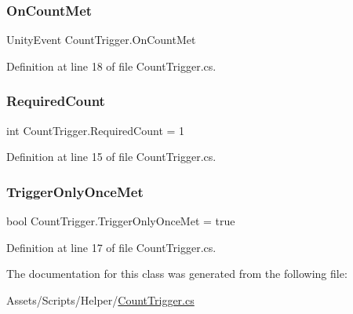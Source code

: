 \subsubsection{\texorpdfstring{On\+Count\+Met}{OnCountMet}}
{\footnotesize\ttfamily Unity\+Event Count\+Trigger.\+On\+Count\+Met}



Definition at line 18 of file Count\+Trigger.\+cs.

\mbox{\label{class_count_trigger_a84809838e4a7ce1f4e4ab8631ad00e37}} 
\subsubsection{\texorpdfstring{Required\+Count}{RequiredCount}}
{\footnotesize\ttfamily int Count\+Trigger.\+Required\+Count = 1}



Definition at line 15 of file Count\+Trigger.\+cs.

\mbox{\label{class_count_trigger_a4e29714cf7b88cca2c0806286eb0e26e}} 
\subsubsection{\texorpdfstring{Trigger\+Only\+Once\+Met}{TriggerOnlyOnceMet}}
{\footnotesize\ttfamily bool Count\+Trigger.\+Trigger\+Only\+Once\+Met = true}



Definition at line 17 of file Count\+Trigger.\+cs.



The documentation for this class was generated from the following file\+:\begin{DoxyCompactItemize}
\item 
Assets/\+Scripts/\+Helper/\mbox{\hyperlink{_count_trigger_8cs}{Count\+Trigger.\+cs}}\end{DoxyCompactItemize}
